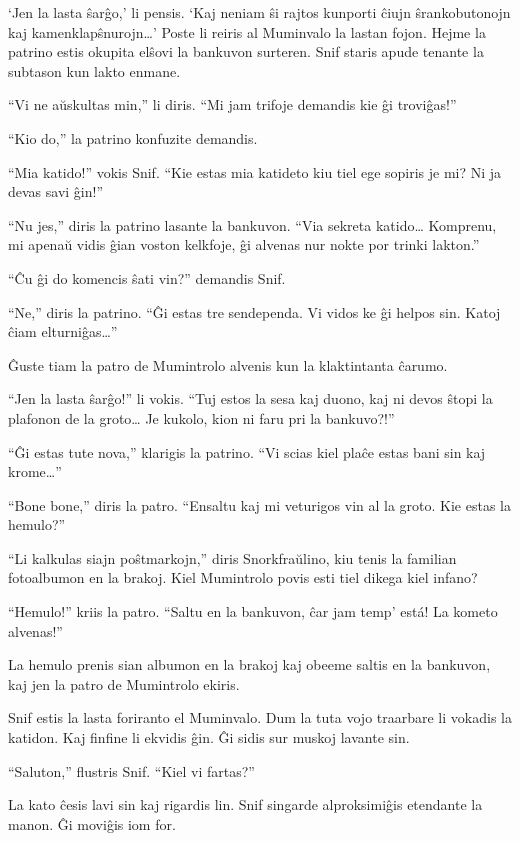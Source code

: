 `Jen la lasta ŝarĝo,' li pensis. `Kaj neniam ŝi rajtos kunporti ĉiujn ŝrankobutonojn kaj kamenklapŝnurojn{\ldots}' Poste li reiris al Muminvalo la lastan fojon.
\sectionbreak
Hejme la patrino estis okupita elŝovi la bankuvon surteren. Snif staris apude tenante la subtason kun lakto enmane.

``Vi ne aŭskultas min,'' li diris. ``Mi jam trifoje demandis kie ĝi troviĝas!''

``Kio do,'' la patrino konfuzite demandis.

``Mia katido!'' vokis Snif. ``Kie estas mia katideto kiu tiel ege sopiris je mi? Ni ja devas savi ĝin!''

``Nu jes,'' diris la patrino lasante la bankuvon. ``Via sekreta katido{\ldots} Komprenu, mi apenaŭ vidis ĝian voston kelkfoje, ĝi alvenas nur nokte por trinki lakton.''

``Ĉu ĝi do komencis ŝati vin?'' demandis Snif.

``Ne,'' diris la patrino. ``Ĝi estas tre sendependa. Vi vidos ke ĝi helpos sin. Katoj ĉiam elturniĝas{\ldots}''

Ĝuste tiam la patro de Mumintrolo alvenis kun la klaktintanta ĉarumo.

``Jen la lasta ŝarĝo!'' li vokis. ``Tuj estos la sesa kaj duono, kaj ni devos ŝtopi la plafonon de la groto{\ldots} Je kukolo, kion ni faru pri la bankuvo?!''

``Ĝi estas tute nova,'' klarigis la patrino. ``Vi scias kiel plaĉe estas bani sin kaj krome{\ldots}''

``Bone bone,'' diris la patro. ``Ensaltu kaj mi veturigos vin al la groto. Kie estas la hemulo?''

``Li kalkulas siajn poŝtmarkojn,'' diris Snorkfraŭlino, kiu tenis la familian fotoalbumon en la brakoj. Kiel Mumintrolo povis esti tiel dikega kiel infano?

``Hemulo!'' kriis la patro. ``Saltu en la bankuvon, ĉar jam temp' está! La kometo alvenas!''

La hemulo prenis sian albumon en la brakoj kaj obeeme saltis en la bankuvon, kaj jen la patro de Mumintrolo ekiris.

Snif estis la lasta foriranto el Muminvalo. Dum la tuta vojo traarbare li vokadis la katidon. Kaj finfine li ekvidis ĝin. Ĝi sidis sur muskoj lavante sin.

``Saluton,'' flustris Snif. ``Kiel vi fartas?''

La kato ĉesis lavi sin kaj rigardis lin. Snif singarde alproksimiĝis etendante la manon. Ĝi moviĝis iom for.


